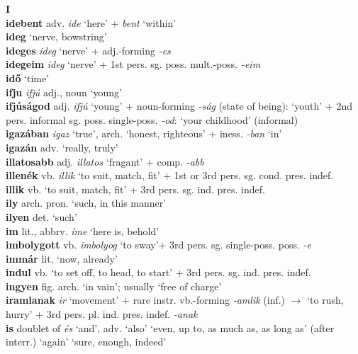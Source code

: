 \documentclass[11pt]{article}
\begin{document}
\noindent \textbf{\large I} \\
\textbf{idebent} adv. \emph{ide} `here' + \emph{bent} `within' \\
\textbf{ideg} `nerve, bowstring' \\
\textbf{ideges} \emph{ideg} `nerve' + adj.\hyp{}forming \emph{-es} \\
\textbf{idegeim} \emph{ideg} `nerve' + 1st
pers. sg. poss. mult.\hyp{}poss. \emph{-eim} \\
\textbf{idő} `time' \\
\textbf{ifju} \emph{ifjú} adj., noun `young' \\
\textbf{ifjúságod} adj. \emph{ifjú} `young' + noun\hyp{}forming \emph{-ság}
(state of being): `youth' + 2nd pers. informal
sg. poss. single\hyp{}poss. \emph{-od}: `your childhood' (informal) \\
\textbf{igazában} \emph{igaz} `true', arch. `honest, righteous' +
iness. \emph{-ban} `in' \\
\textbf{igazán} adv. `really, truly' \\
\textbf{illatosabb} adj. \emph{illatos} `fragant' +
comp. \emph{-abb} \\
\textbf{illenék} vb. \emph{illik} `to suit, match, fit' + 1st or 3rd pers. sg. cond. pres. indef. \\
\textbf{illik} vb. `to suit, match, fit' + 3rd
pers. sg. ind. pres. indef. \\
\textbf{ily} arch. pron. `such, in this manner' \\
\textbf{ilyen} det. `such' \\
\textbf{im} lit., abbrv. \emph{íme} `here is, behold' \\
\textbf{imbolygott} vb. \emph{imbolyog} `to sway'+ 3rd
pers. sg. single\hyp{}poss. poss. \emph{-e} \\
\textbf{immár} lit. `now, already' \\
\textbf{indul} vb. `to set off, to head, to start' + 3rd
pers. sg. ind. pres. indef. \\
\textbf{ingyen} fig. arch. `in vain'; usually `free of charge' \\
\textbf{iramlanak} \emph{ir} `movement' + rare
instr. vb.-forming \emph{-amlik} (inf.) $\rightarrow$ `to rush, hurry'
+ 3rd pers. pl. ind. pres. indef. \emph{-anak} \\
\textbf{is} doublet of \emph{és} `and',
adv. `also' \textbar\textbar{} `even, up to, as much as, as long
as' \textbar\textbar{} (after interr.) `again' \textbar\textbar{}
`sure, enough, indeed' \\
\end{document}
